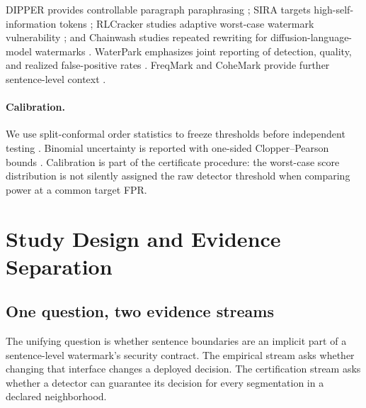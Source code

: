 \documentclass[10pt]{article}
\begin{document}
DIPPER provides controllable paragraph paraphrasing
\citep{krishna2023dipper}; SIRA targets high-self-information tokens
\citep{cheng2025sira}; RLCracker studies adaptive worst-case watermark
vulnerability \citep{huang2026rlcracker}; and Chainwash studies repeated
rewriting for diffusion-language-model watermarks
\citep{ameen2026chainwash}. WaterPark emphasizes joint reporting of
detection, quality, and realized false-positive rates
\citep{liang2025waterpark}. FreqMark and CoheMark provide further
sentence-level context \citep{xu2024freqmark,zhang2025cohemark}.

\paragraph{Calibration.}
We use split-conformal order statistics to freeze thresholds before
independent testing \citep{angelopoulos2023gentle}. Binomial uncertainty is
reported with one-sided Clopper--Pearson bounds
\citep{clopper1934confidence}. Calibration is part of the certificate
procedure: the worst-case score distribution is not silently assigned the
raw detector threshold when comparing power at a common target FPR.

\section{Study Design and Evidence Separation}

\subsection{One question, two evidence streams}

The unifying question is whether sentence boundaries are an implicit part of
a sentence-level watermark's security contract. The empirical stream asks
whether changing that interface changes a deployed decision. The
certification stream asks whether a detector can guarantee its decision for
every segmentation in a declared neighborhood.
\end{document}
